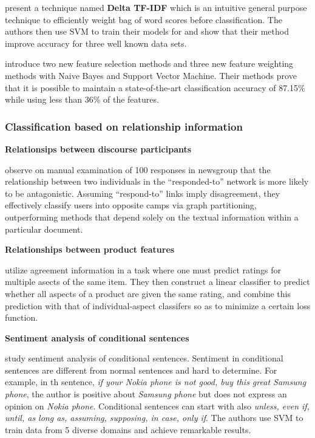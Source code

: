 \documentclass{article}
\begin{document}
\begin{multicols}{2}
        \citet{Martineau2009a} present a technique named \textbf{Delta TF-IDF}
which is an intuitive general purpose technique to efficiently weight bag of word 
scores before classification. The authors then use SVM to train their models 
for and show that their method improve accuracy for three well known data sets.

        \citet{Keefe2006} introduce two new feature selection methods and three
new feature weighting methods with Naive Bayes and Support Vector Machine.
Their methods prove that it is possible to maintain a state-of-the-art
classification accuracy of 87.15\% while using less than 36\% of the features.

    \subsubsection{Classification based  on relationship information}
      \textbf{Relationsips between discourse participants}
            
        \citet{Agrawal2003} observe on manual examination of 100
responses in newsgroup that the relationship between two individuals in the
``responded-to'' network is more likely to be antagonistic. Assuming
``respond-to'' links imply disagreement, they effectively classify users into
opposite camps via graph partitioning, outperforming methods that depend solely
on the textual information within a particular document.

      \textbf{Relationships between product features}
          
        \citet{Snyder2007} utilize agreement information in a task where
one must predict ratings for multiple asects of the same item. They then
construct a linear classifier to predict whether all aspects of a product are
given the same rating, and combine this prediction with that of
individual-aspect classifers so as to minimize a certain loss function.
\cite{Snyder2007}
        
       \textbf{Sentiment analysis of conditional sentences}

        \citet{Narayanan2009} study sentiment analysis of conditional sentences.
Sentiment in conditional sentences are different from normal sentences and hard
to determine. For example, in th sentence, \textit{if your Nokia phone is not
good, buy this great Samsung phone}, the author is positive about \textit{
Samsung phone} but does not express an opinion on \textit{Nokia phone}.
Conditional sentences can start with also \textit{unless, even if, until, as long
as, assuming, supposing, in case, only if}. The authors use SVM to train data
from 5 diverse domains and achieve remarkable results.



\end{multicols}
\end{document}
